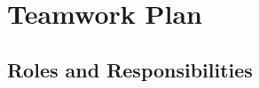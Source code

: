 \section{Teamwork Plan}
\label{sec:teamwork-plan}
\subsection{Roles and Responsibilities}
\label{subsec:roles-and-responsibilities}


\vspace{1em}

\centering
\small
